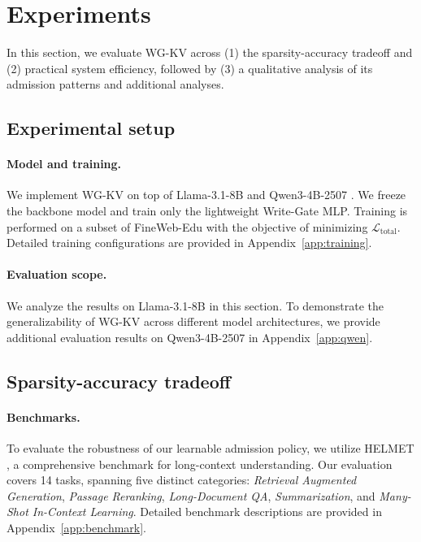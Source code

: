 \section{Experiments}

In this section, we evaluate WG-KV across (1) the sparsity-accuracy tradeoff and (2) practical system efficiency, followed by (3) a qualitative analysis of its admission patterns and additional analyses.

\subsection{Experimental setup}

\paragraph{Model and training.} We implement WG-KV on top of Llama-3.1-8B \cite{llama3} and Qwen3-4B-2507 \cite{qwen3}. We freeze the backbone model and train only the lightweight Write-Gate MLP. Training is performed on a subset of FineWeb-Edu \cite{fineweb} with the objective of minimizing  $\mathcal{L}_{\text{total}}$. Detailed training configurations are provided in Appendix~\ref{app:training}.

\paragraph{Evaluation scope.} We analyze the results on Llama-3.1-8B in this section. To demonstrate the generalizability of WG-KV across different model architectures, we provide additional evaluation results on Qwen3-4B-2507 in Appendix~\ref{app:qwen}.


\subsection{Sparsity-accuracy tradeoff}
\label{sec:tradeoff}

\paragraph{Benchmarks.} To evaluate the robustness of our learnable admission policy, we utilize HELMET \cite{helmet}, a comprehensive benchmark for long-context understanding. Our evaluation covers 14 tasks, spanning five distinct categories: \textit{Retrieval Augmented Generation}, \textit{Passage Reranking}, \textit{Long-Document QA}, \textit{Summarization}, and \textit{Many-Shot In-Context Learning}. Detailed benchmark descriptions are provided in Appendix~\ref{app:benchmark}.

